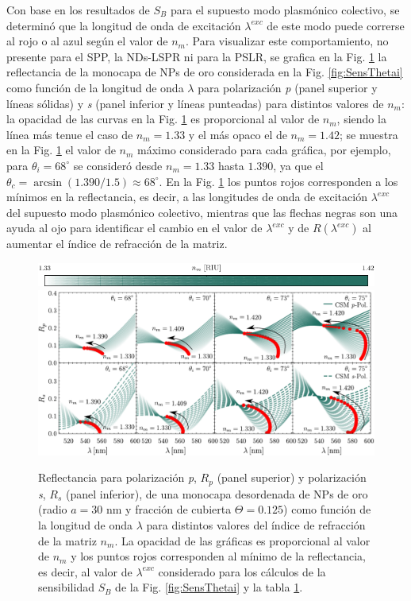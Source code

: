 Con base en los resultados de $S_B$ para el supuesto modo  plasmónico colectivo, se determinó que la longitud de onda de excitación $\lambda^{exc}$ de este modo puede correrse al rojo o al azul según el valor de $n_m$. Para visualizar este comportamiento, no presente para el SPP, la NDs-LSPR ni para la PSLR, se grafica en la Fig. \ref{fig:SensRpRs} la reflectancia de la monocapa de NPs de oro considerada en la Fig. \ref{fig:SensThetai} como función de la longitud de onda $\lambda$ para polarización \emph{p} (panel superior y líneas sólidas) y \emph{s} (panel inferior y líneas punteadas) para distintos valores de $n_m$: la opacidad de las curvas en la Fig. \ref{fig:SensRpRs} es proporcional al valor de $n_m$, siendo la línea más tenue el caso de $n_m=1.33$ y el más opaco el de $n_m=1.42$; se muestra en la Fig. \ref{fig:SensRpRs} el valor de $n_m$ máximo considerado para cada gráfica, por ejemplo, para $\theta_i=68^\circ$ se consideró desde $n_m=1.33$ hasta $1.390$, ya que el $\theta_c=\arcsin(1.390/1.5)\approx 68^\circ$. En la Fig. \ref{fig:SensRpRs} los puntos rojos corresponden a los mínimos en la reflectancia, es decir, a las longitudes de onda de excitación $\lambda^{exc}$ del supuesto modo plasmónico colectivo, mientras que las flechas negras son una ayuda al ojo para identificar el cambio en el valor de $\lambda^{exc}$ y de $R(\lambda^{exc})$ al aumentar el índice de refracción de la matriz.

\begin{figure}[h!]\centering
	\includegraphics[width=1\linewidth]{2-Resultados/figs/0-nmBar_h}
	\includegraphics[width=1\linewidth]{2-Resultados/figs/11-SPPCSM/2-RpRs}\vspace*{-.7em}%
\caption{Reflectancia para polarización \emph{p}, $R_p$ (panel superior) y polarización \emph{s}, $R_s$ (panel inferior), de una monocapa desordenada de NPs de oro (radio $a=30$ nm y fracción de cubierta $\Theta=0.125$)  como función de la longitud de onda $\lambda$ para distintos valores del  índice de refracción de la matriz $n_m$. La opacidad de las gráficas es proporcional al valor de $n_m$  y los puntos rojos corresponden al mínimo de la reflectancia, es decir, al valor de $\lambda^{exc}$ considerado para los cálculos de la sensibilidad $S_B$ de la Fig. \ref{fig:SensThetai} y la tabla \ref{fig:SensRpRs}.	
	}\label{fig:SensRpRs}
	\end{figure}	

